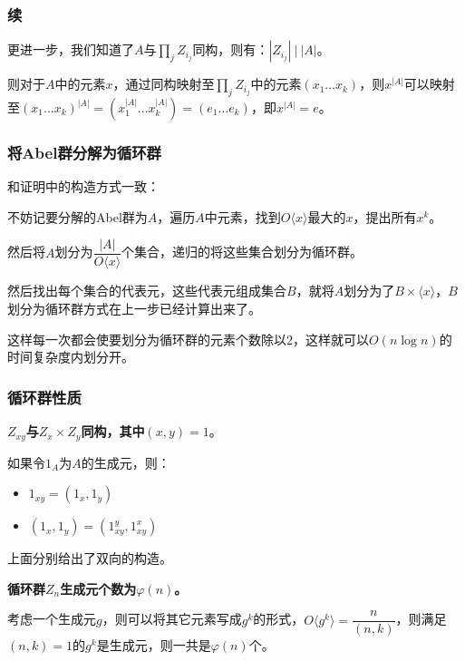 \documentclass[10pt]{beamer}
\begin{document}
	\begin{frame}
		\frametitle{续}
	
		更进一步，我们知道了$A$与$\prod_j Z_{i_j}$同构，则有：$|Z_{i_j}|~{\big|}~|A|$。

		则对于$A$中的元素$x$，通过同构映射至$\prod_j Z_{i_j}$中的元素$(x_1\dots x_k)$，则$x^{|A|}$可以映射至$(x_1\dots x_k)^{|A|}=(x_1^{|A|}\dots x_k^{|A|})=(e_1\dots e_k)$，即$x^{|A|}=e$。
	
	\end{frame}
	\begin{frame}
		\frametitle{将Abel群分解为循环群}
	
		和证明中的构造方式一致：

		不妨记要分解的Abel群为$A$，遍历$A$中元素，找到$O\langle x\rangle$最大的$x$，提出所有$x^k$。

		然后将$A$划分为$\dfrac{|A|}{O\langle x\rangle}$个集合，递归的将这些集合划分为循环群。

		然后找出每个集合的代表元，这些代表元组成集合$B$，就将$A$划分为了$B\times \langle x\rangle$，$B$划分为循环群方式在上一步已经计算出来了。

		这样每一次都会使要划分为循环群的元素个数除以$2$，这样就可以$O(n\log n)$的时间复杂度内划分开。
	
	\end{frame}
	\begin{frame}
		\frametitle{循环群性质}
	
		\textbf{$Z_{xy}$与$Z_x\times Z_y$同构，其中$(x,y)=1$}。
		
		如果令$1_A$为$A$的生成元，则：

		\begin{itemize}
			\item $1_{xy}=(1_x,1_y)$
			\item $(1_x,1_y)=(1_{xy}^y,1_{xy}^x)$
		\end{itemize}

		上面分别给出了双向的构造。

		\textbf{循环群$Z_n$生成元个数为$\varphi(n)$。}

		考虑一个生成元$g$，则可以将其它元素写成$g^k$的形式，$O\langle g^k\rangle=\dfrac{n}{(n,k)}$，则满足$(n,k)=1$的$g^k$是生成元，则一共是$\varphi(n)$个。
	
	\end{frame}
\end{document}
